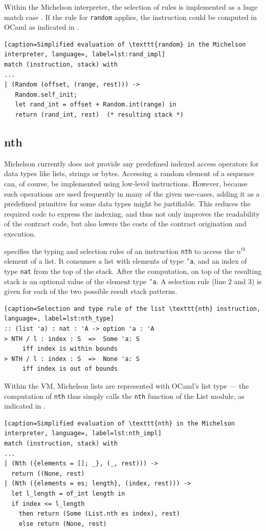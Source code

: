 Within the Michelson interpreter, the selection of rules is implemented as a huge match case \cite{tezos_repo}. If the rule for \texttt{random} applies, the instruction could be computed in OCaml as indicated in .
\begin{lstlisting}[caption=Simplified evaluation of \texttt{random} in the Michelson interpreter, language=, label=lst:rand_impl]
match (instruction, stack) with
...
| (Random (offset, (range, rest))) ->
   Random.self_init;
   let rand_int = offset + Random.int(range) in
   return (rand_int, rest)  (* resulting stack *)
\end{lstlisting}

\subsection{nth}\label{sec:nth}
Michelson currently does not provide any predefined indexed access operators for data types like lists, strings or bytes. Accessing a random element of a sequence can, of course, be implemented using low-level instructions. However, because such operations are used frequently in many of the given use-cases, adding it as a predefined primitive for some data types might be justifiable. This reduces the required code to express the indexing, and thus not only improves the readability of the contract code, but also lowers the costs of the contract origination and execution.

 specifies the typing and selection rules of an instruction \texttt{nth} to access the $n^{th}$ element of a list. It consumes a list with elements of type \texttt{'a}, and an index of type \texttt{nat} from the top of the stack. After the computation, on top of the resulting stack is an optional value of the element type \texttt{'a}. A selection rule (line 2 and 3) is given for each of the two possible result stack patterns.
\begin{lstlisting}[caption=Selection and type rule of the list \texttt{nth} instruction, language=, label=lst:nth_type]
:: (list 'a) : nat : 'A -> option 'a : 'A
> NTH / l : index : S  =>  Some 'a: S
     iff index is within bounds
> NTH / l : index : S  =>  None 'a: S
     iff index is out of bounds
\end{lstlisting}

Within the VM, Michelson lists are represented with OCaml's list type --- the computation of \texttt{nth} thus simply calls the \texttt{nth} function of the List module, as indicated in .
\begin{lstlisting}[caption=Simplified evaluation of \texttt{nth} in the Michelson interpreter, language=, label=lst:nth_impl]
match (instruction, stack) with
...
| (Nth ({elements = []; _}, (_, rest))) ->
  return ((None, rest)
| (Nth ({elements = es; length}, (index, rest))) ->
  let l_length = of_int length in
  if index <= l_length
    then return (Some (List.nth es index), rest)
    else return (None, rest)
\end{lstlisting}
\lstset{upquote=false}

